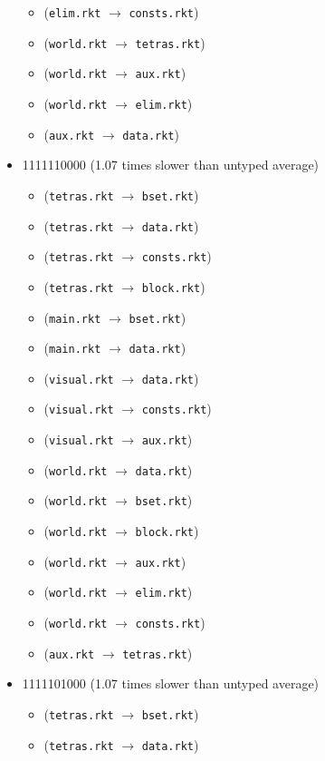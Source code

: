 \documentclass{article}
\newcommand{\mono}[1]{\texttt{#1}}
\begin{document}
\begin{itemize}
\begin{itemize}
  \item (\mono{elim.rkt} $\rightarrow$ \mono{consts.rkt})
  \item (\mono{world.rkt} $\rightarrow$ \mono{tetras.rkt})
  \item (\mono{world.rkt} $\rightarrow$ \mono{aux.rkt})
  \item (\mono{world.rkt} $\rightarrow$ \mono{elim.rkt})
  \item (\mono{aux.rkt} $\rightarrow$ \mono{data.rkt})
  \end{itemize}
\item 1111110000 (1.07 times slower than untyped average)
  \begin{itemize}
  \item (\mono{tetras.rkt} $\rightarrow$ \mono{bset.rkt})
  \item (\mono{tetras.rkt} $\rightarrow$ \mono{data.rkt})
  \item (\mono{tetras.rkt} $\rightarrow$ \mono{consts.rkt})
  \item (\mono{tetras.rkt} $\rightarrow$ \mono{block.rkt})
  \item (\mono{main.rkt} $\rightarrow$ \mono{bset.rkt})
  \item (\mono{main.rkt} $\rightarrow$ \mono{data.rkt})
  \item (\mono{visual.rkt} $\rightarrow$ \mono{data.rkt})
  \item (\mono{visual.rkt} $\rightarrow$ \mono{consts.rkt})
  \item (\mono{visual.rkt} $\rightarrow$ \mono{aux.rkt})
  \item (\mono{world.rkt} $\rightarrow$ \mono{data.rkt})
  \item (\mono{world.rkt} $\rightarrow$ \mono{bset.rkt})
  \item (\mono{world.rkt} $\rightarrow$ \mono{block.rkt})
  \item (\mono{world.rkt} $\rightarrow$ \mono{aux.rkt})
  \item (\mono{world.rkt} $\rightarrow$ \mono{elim.rkt})
  \item (\mono{world.rkt} $\rightarrow$ \mono{consts.rkt})
  \item (\mono{aux.rkt} $\rightarrow$ \mono{tetras.rkt})
  \end{itemize}
\item 1111101000 (1.07 times slower than untyped average)
  \begin{itemize}
  \item (\mono{tetras.rkt} $\rightarrow$ \mono{bset.rkt})
  \item (\mono{tetras.rkt} $\rightarrow$ \mono{data.rkt})

\end{itemize}
\end{itemize}
\end{document}
